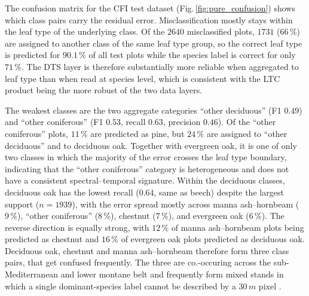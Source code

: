 \documentclass[essd, manuscript]{copernicus}
\begin{document}
The confusion matrix for the CFI test dataset (Fig.\,\ref{fig:pure_confusion}) shows which class pairs carry the residual error. Misclassification mostly stays within the leaf type of the underlying class. Of the $2640$ misclassified plots, $1731$ ($66\,\%$) are assigned to another class of the same leaf type group, so the correct leaf type is predicted for $90.1\,\%$ of all test plots while the species label is correct for only $71\,\%$. The DTS layer is therefore substantially more reliable when aggregated to leaf type than when read at species level, which is consistent with the LTC product being the more robust of the two data layers.

The weakest classes are the two aggregate categories ``other deciduous'' (F1 $0.49$) and ``other coniferous'' (F1 $0.53$, recall $0.63$, precision $0.46$). Of the ``other coniferous'' plots, $11\,\%$ are predicted as pine, but $24\,\%$ are assigned to ``other deciduous'' and to deciduous oak. Together with evergreen oak, it is one of only two classes in which the majority of the error crosses the leaf type boundary, indicating that the ``other coniferous'' category is heterogeneous and does not have a consistent spectral--temporal signature. Within the deciduous classes, deciduous oak has the lowest recall ($0.64$, same as beech) despite the largest support ($n=1939$), with the error spread mostly across manna ash--hornbeam ($9\,\%$), ``other coniferous'' ($8\,\%$), chestnut ($7\,\%$), and evergreen oak ($6\,\%$). %
The reverse direction is equally strong, with $12\,\%$ of manna ash--hornbeam plots being predicted as chestnut and $16\,\%$ of evergreen oak plots predicted as deciduous oak. Deciduous oak, chestnut and manna ash--hornbeam therefore form three class pairs, that get confused frequently. The three are co.-occuring across the sub-Mediterranean and lower montane belt and frequently form mixed stands in which a single dominant-species label cannot be described by a $30\,\unit{m}$ pixel \citep{bricca_topography_2026}.
\end{document}
